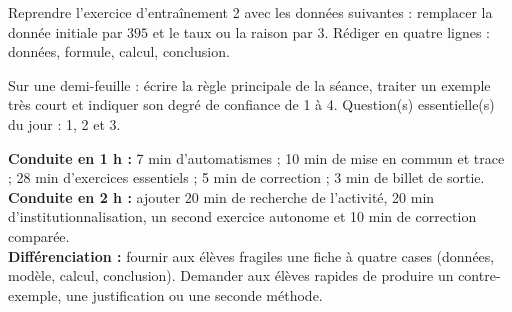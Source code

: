 \begin{dm}Reprendre l'exercice d'entraînement 2 avec les données suivantes : remplacer la donnée initiale par $395$ et le taux ou la raison par $3$. Rédiger en quatre lignes : données, formule, calcul, conclusion.\end{dm}

\begin{sortie}Sur une demi-feuille : écrire la règle principale de la séance, traiter un exemple très court et indiquer son degré de confiance de 1 à 4. Question(s) essentielle(s) du jour : 1, 2 et 3.\end{sortie}

\ifprof
\begin{methode}
\textbf{Conduite en 1 h :} 7 min d'automatismes ; 10 min de mise en commun et trace ; 28 min d'exercices essentiels ; 5 min de correction ; 3 min de billet de sortie.\\
\textbf{Conduite en 2 h :} ajouter 20 min de recherche de l'activité, 20 min d'institutionnalisation, un second exercice autonome et 10 min de correction comparée.\\
\textbf{Différenciation :} fournir aux élèves fragiles une fiche à quatre cases (données, modèle, calcul, conclusion). Demander aux élèves rapides de produire un contre-exemple, une justification ou une seconde méthode.
\end{methode}
\fi
